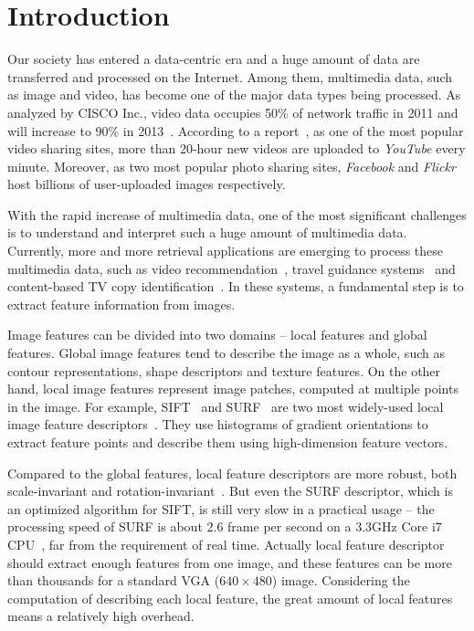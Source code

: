 \section{Introduction}
\label{sec:introduction}

Our society has entered a data-centric era and a huge amount of data are transferred and processed on the Internet. Among them, multimedia data, such as image and video, has become one of the major data types being processed. As analyzed by CISCO Inc., video data occupies 50\% of network traffic in 2011 and will increase to 90\% in 2013~\cite{index2010forecast}.  According to a report~\cite{jansohn2009detecting}, as one of the most popular video sharing sites, more than 20-hour new videos are uploaded to \emph{YouTube} every minute. Moreover, as two most popular photo sharing sites, \emph{Facebook} and \emph{Flickr} host billions of user-uploaded images respectively.

With the rapid increase of multimedia data, one of the most significant challenges is to understand and interpret such a huge amount of multimedia data. Currently, more and more retrieval applications are emerging to process these multimedia data, such as video recommendation~\cite{videorecommendation2007}, travel guidance systems~\cite{travelguidance2010} and content-based TV copy identification~\cite{tvidentify2003}. In these systems, a fundamental step is to extract feature information from images. 

Image features can be divided into two domains -- local features and global features. Global image features tend to describe the image as a whole, such as contour representations, shape descriptors and texture features. On the other hand, local image features represent image patches, computed at multiple points in the image. For example, SIFT~\cite{Lowe2004SIFT,RobHess} and SURF~\cite{Bay2006SURF,Evans20009OpenSURF} are two most widely-used local image feature descriptors~\cite{Mikolajczyk2005Evaluation}\cite{Bauer2007Evaluation}. They use histograms of gradient orientations to extract feature points and describe them using high-dimension feature vectors.

Compared to the global features, local feature descriptors are more robust, both scale-invariant and rotation-invariant~\cite{mikolajczyk2005performance}\cite{Bauer2007Evaluation}. But even the SURF descriptor, which is an optimized algorithm for SIFT, is still very slow in a practical usage -- the processing speed of SURF is about 2.6 frame per second on a 3.3GHz Core i7 CPU~\cite{Fang2011ispass}, far from the requirement of real time. Actually local feature descriptor should extract enough features from one image, and these features can be more than thousands for a standard VGA ($640\times480$) image. Considering the computation of describing each local feature, the great amount of local features means a relatively high overhead.

